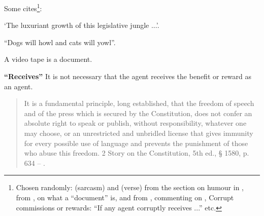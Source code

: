 Some cites\footnote{Chosen randomly:  (sarcasm) and  (verse) from the section on humour in \cite[295]{butt},  from \cite[187]{butt}, on what a ``document'' is, and  from \cite[para \mkbibbrackets{8-s 249B.5}, p 1070]{anncrimnsw}, commenting on , Corrupt commissions or rewards: ``If any agent corruptly receives ...'' etc.}:
\begin{inparaenum}[\itshape (a)]\item `The luxuriant growth of this legislative jungle ...'. \item ``Dogs will howl and cats will yowl''. \item A video tape is a document. \item \textbf{``Receives''} It is not necessary that the agent receives the benefit or reward as an agent.\end{inparaenum} 


\begin{quotation}
It is a fundamental principle, long established, that the freedom of speech and of the press which is secured by the Constitution, does not confer an absolute right to speak or publish, without responsibility, whatever one may choose, or an unrestricted and unbridled license that gives immu\-nity for every possible use of language and prevents the punishment of those who abuse this freedom. 2 Story on the Constitution, 5th ed., § 1580, p. 634 -- .%
\end{quotation}


